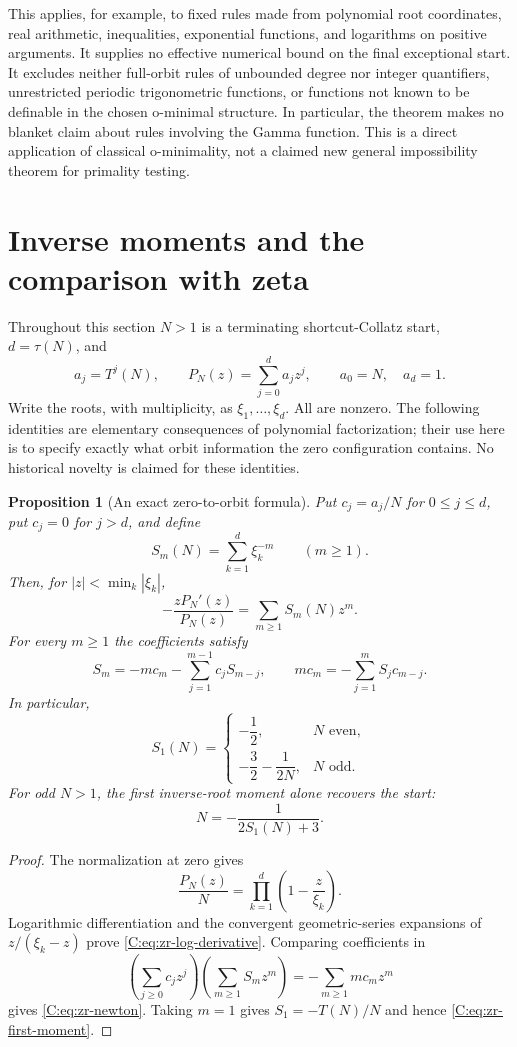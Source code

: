 \documentclass[11pt,a4paper]{article}
\newtheorem{proposition}[theorem]{Proposition}
\theoremstyle{definition}
\theoremstyle{remark}
\numberwithin{equation}{section}
\begin{document}
This applies, for example, to fixed rules made from polynomial root
coordinates, real arithmetic, inequalities, exponential functions, and
logarithms on positive arguments. It supplies no effective numerical
bound on the final exceptional start. It excludes neither full-orbit
rules of unbounded degree nor integer quantifiers, unrestricted periodic
trigonometric functions, or functions not known to be definable in the
chosen o-minimal structure. In particular, the theorem makes no blanket
claim about rules involving the Gamma function. This is a direct
application of classical o-minimality, not a claimed new general
impossibility theorem for primality testing.


\section{Inverse moments and the comparison with zeta}\label{C:sec:zero-zeta}


Throughout this section $N>1$ is a terminating shortcut-Collatz start,
$d=\tau(N)$, and
\[
 a_j=T^j(N),\qquad P_N(z)=\sum_{j=0}^{d}a_jz^j,
 \qquad a_0=N,\quad a_d=1.
\]
Write the roots, with multiplicity, as $\xi_1,\ldots,\xi_d$.
All are nonzero. The following identities are elementary consequences of
polynomial factorization; their use here is to specify exactly what orbit
information the zero configuration contains. No historical novelty is claimed
for these identities.

\begin{proposition}[An exact zero-to-orbit formula]
\label{C:prop:zr-inverse-moments}
Put $c_j=a_j/N$ for $0\leq j\leq d$, put $c_j=0$ for $j>d$, and define
\[
 S_m(N)=\sum_{k=1}^{d}\xi_k^{-m}\qquad(m\geq1).
\]
Then, for $|z|<\min_k|\xi_k|$,
\begin{equation}\label{C:eq:zr-log-derivative}
 -\frac{zP_N'(z)}{P_N(z)}=\sum_{m\geq1}S_m(N)z^m.
\end{equation}
For every $m\geq1$ the coefficients satisfy
\begin{equation}\label{C:eq:zr-newton}
 S_m=-mc_m-\sum_{j=1}^{m-1}c_jS_{m-j},
 \qquad
 mc_m=-\sum_{j=1}^{m}S_jc_{m-j}.
\end{equation}
In particular,
\begin{equation}\label{C:eq:zr-first-moment}
 S_1(N)=
 \begin{cases}
 -\dfrac12,&N\text{ even},\\[4pt]
 -\dfrac32-\dfrac1{2N},&N\text{ odd}.
 \end{cases}
\end{equation}
For odd $N>1$, the first inverse-root moment alone recovers the start:
\[
 N=-\frac{1}{2S_1(N)+3}.
\]
\end{proposition}
\begin{proof}
The normalization at zero gives
\[
 \frac{P_N(z)}{N}=\prod_{k=1}^{d}\left(1-\frac z{\xi_k}\right).
\]
Logarithmic differentiation and the convergent geometric-series expansions of
$z/(\xi_k-z)$ prove \eqref{C:eq:zr-log-derivative}. Comparing coefficients in
\[
 \left(\sum_{j\geq0}c_jz^j\right)
 \left(\sum_{m\geq1}S_mz^m\right)
 =-\sum_{m\geq1}mc_mz^m
\]
gives \eqref{C:eq:zr-newton}. Taking $m=1$ gives $S_1=-T(N)/N$ and hence
\eqref{C:eq:zr-first-moment}.
\end{proof}
\end{document}
